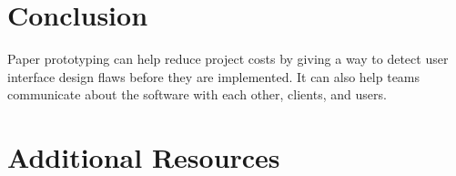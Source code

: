 \section{Conclusion}
Paper prototyping can help reduce project costs by giving a way to detect user interface design flaws before they are implemented. It can also help teams communicate about the software with each other, clients, and users.

\section{Additional Resources}

\begin{description}
\item {}
\item {}
\item {}
\end{description}